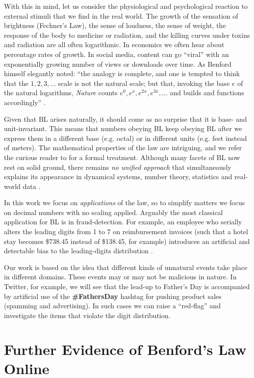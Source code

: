 \documentclass[twoside,leqno,twocolumn]{article}\usepackage[]{graphicx}\usepackage[]{color}
\begin{document}
With this in mind, let us consider the physiological and psychological reaction to external stimuli that we find in the real world. The growth of the sensation of brightness (Fechner's Law), the sense of loudness, the sense of weight, the response of the body to medicine or radiation, and the killing curves under toxins and radiation are all often logarithmic. In economics we often hear about percentage rates of growth. In social media, content can go ``viral'' with an exponentially growing number of views or downloads over time. As Benford himself elegantly noted: ``the analogy is complete, and one is tempted to think that the $1, 2, 3, \ldots$ scale is not the natural scale; but that, invoking the base $e$ of the natural logarithms, \textit{Nature} counts $e^0, e^x, e^{2x}, e^{3x}, \ldots$ and builds and functions accordingly'' \cite{benford1938law}.

Given that BL arises naturally, it should come as no surprise that it is base- and unit-invariant. This means that numbers obeying BL keep obeying BL after we express them in a different base (e.g. octal) or in different units (e.g. feet instead of meters). The mathematical properties of the law are intriguing, and we refer the curious reader to \cite{berger2015Intro} for a formal treatment. Although many facets of BL now rest on solid ground, there remains \textit{no unified approach} that simultaneously explains its appearance in dynamical systems, number theory, statistics and real-world data \cite{berger2011benford}. 

In this work we focus on \textit{applications} of the law, so to simplify matters we focus on decimal numbers with no scaling applied. Arguably the most classical application for BL is in fraud-detection. For example, an employee who serially alters the leading digits from 1 to 7 on reimbursement invoices (such that a hotel stay becomes \$738.45 instead of \$138.45, for example) introduces an artificial and detectable bias to the leading-digits distribution \cite{nigrini2012}.

Our work is based on the idea that different kinds of unnatural events take place in different domains. These events may or may not be malicious in nature. In Twitter, for example, we will see that the lead-up to Father's Day is accompanied by artificial use of the \textbf{\#FathersDay} hashtag for pushing product sales (spamming and advertising). In such cases we can raise a ``red-flag'' and investigate the items that violate the digit distribution.

\section{Further Evidence of Benford's Law Online}
\label{sec:case-study:-github}
\end{document}
